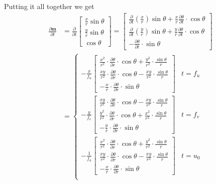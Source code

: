 \documentclass[12pt,a4paper]{amsart}
\renewcommand{\v}[1]{\mathbf{#1}}
\newcommand{\dd}[1]{\frac{\partial}{\partial #1}}
\newcommand{\ddd}[2]{\frac{\partial #1}{\partial #2}}
\begin{document}
Putting it all together we get
\begin{align*}
  \ddd{\v{m}}{t} & = \dd{t} \left[ \begin{array}{c} \frac{x}{r}\sin\theta \\ \frac{y}{r}\sin\theta \\ \cos\theta \end{array} \right]
    = \left[ \begin{array}{c}
      \dd{t} \left( \frac{x}{r} \right) \sin\theta + \frac{x}{r} \ddd{\theta}{t} \cdot \cos\theta \\
      \dd{t} \left( \frac{y}{r} \right) \sin\theta + \frac{y}{r} \ddd{\theta}{t} \cdot \cos\theta \\
      - \ddd{\theta}{t} \cdot \sin\theta
    \end{array} \right] \\
    & = \begin{cases}
          -\frac{x}{f_u} \left[ \begin{array}{c}
            \frac{x^2}{r^2} \cdot \ddd{\theta}{r} \cdot \cos\theta + \frac{y^2}{r^2} \cdot \frac{\sin\theta}{r} \\
            \frac{xy}{r^2}  \cdot \ddd{\theta}{r} \cdot \cos\theta - \frac{xy}{r^2}  \cdot \frac{\sin\theta}{r} \\
           -\frac{x}{r} \cdot \ddd{\theta}{r} \cdot \sin\theta
          \end{array} \right] & t = f_u \\
          -\frac{y}{f_v} \left[ \begin{array}{c}
            \frac{xy}{r^2}  \cdot \ddd{\theta}{r} \cdot \cos\theta - \frac{xy}{r^2}  \cdot \frac{\sin\theta}{r} \\
            \frac{y^2}{r^2} \cdot \ddd{\theta}{r} \cdot \cos\theta + \frac{x^2}{r^2} \cdot \frac{\sin\theta}{r} \\
           -\frac{y}{r} \cdot \ddd{\theta}{r} \cdot \sin\theta
          \end{array} \right] & t = f_v \\
          -\frac{1}{f_u} \left[ \begin{array}{c}
            \frac{x^2}{r^2} \cdot \ddd{\theta}{r} \cdot \cos\theta + \frac{y^2}{r^2} \cdot \frac{\sin\theta}{r} \\
            \frac{xy}{r^2}  \cdot \ddd{\theta}{r} \cdot \cos\theta - \frac{xy}{r^2}  \cdot \frac{\sin\theta}{r} \\
           -\frac{x}{r} \cdot \ddd{\theta}{r} \cdot \sin\theta
          \end{array} \right] & t = u_0 \\

\end{cases}
\end{align*}
\end{document}
